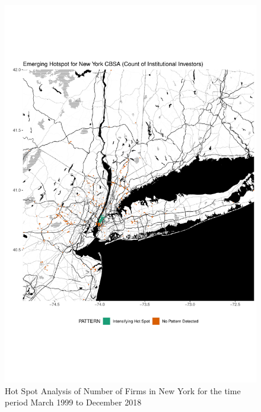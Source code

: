 \begin{figure}
	\centering
	\includegraphics[width=1\linewidth]{Figures/ChapterIV/NY_Count_EH}
	\caption[Hot Spot Analysis of Number of Firms in New York CBSA 1999-2018]{Hot Spot Analysis of Number of Firms in New York for the time period March 1999 to December 2018}
	\label{fig:NYCcounthotspot}
\end{figure}


